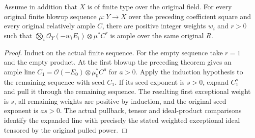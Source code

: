 \begin{lemma}
\label{lem:kn-relative-nadel-weighted-exceptional-ample}
\leanok
{}
Assume in addition that $X$ is of finite type over the original field.
For every original finite blowup sequence $\mu:Y\to X$ over the preceding
coefficient square and every original relatively ample $C$, there are
positive integer weights $w_i$ and $r>0$ such that
$\bigotimes_i\mathcal O_Y(-w_iE_i)\otimes\mu^*C^r$ is ample over the
same original $R$.
\end{lemma}
\begin{proof}
Induct on the actual finite sequence.  For the empty sequence take
$r=1$ and the empty product.  At the first blowup the preceding theorem
gives an ample line $C_1=\mathcal O(-E_0)\otimes\mu_0^*C^a$ for $a>0$.
Apply the induction hypothesis to the remaining sequence with seed
$C_1$.  If its seed exponent is $s>0$, expand $C_1^s$ and pull it through
the remaining sequence.  The resulting first exceptional weight is
$s$, all remaining weights are positive by induction, and the original
seed exponent is $as>0$.  The actual pullback, tensor and ideal-product
comparisons identify the expanded line with precisely the stated
weighted exceptional ideal tensored by the original pulled power.
\end{proof}

